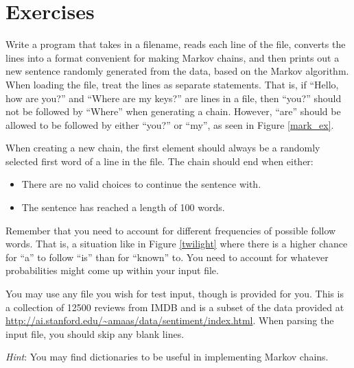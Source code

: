 \documentclass[11pt]{cselabheader}
\begin{document}
\clearpage
\section{Exercises}
\label{sec:ex}


\begin{ex}[markov.py] Write a program that takes in a filename, reads each line of the file, converts the lines into a format convenient for making Markov chains, and then prints out a new sentence randomly generated from the data, based on the Markov algorithm. When loading the file, treat the lines as separate statements. That is, if ``Hello, how are you?'' and ``Where are my keys?'' are lines in a file, then ``you?'' should not be followed by ``Where'' when generating a chain. However, ``are'' should be allowed to be followed by either ``you?'' or ``my'', as seen in Figure \ref{mark_ex}.

  When creating a new chain, the first element should always be a randomly selected first word of a line in the file. The chain should end when either:
  \begin{itemize}
  \item There are no valid choices to continue the sentence with.
  \item The sentence has reached a length of 100 words.
  \end{itemize}

  Remember that you need to account for different frequencies of possible
  follow words. That is, a situation like in Figure \ref{twilight} where
  there is a higher chance for ``a'' to follow ``is'' than for ``known''
  to. You need to account for whatever probabilities might come up within
  your input file.

  You may use any file you wish for test input, though  is provided for you. This is a collection of 12500 reviews from IMDB and is a subset of the data provided at \url{http://ai.stanford.edu/~amaas/data/sentiment/index.html}. When parsing the input file, you should skip any blank lines.

  \emph{Hint}: You may find dictionaries to be useful in implementing
  Markov chains.

\end{ex}
\end{document}
